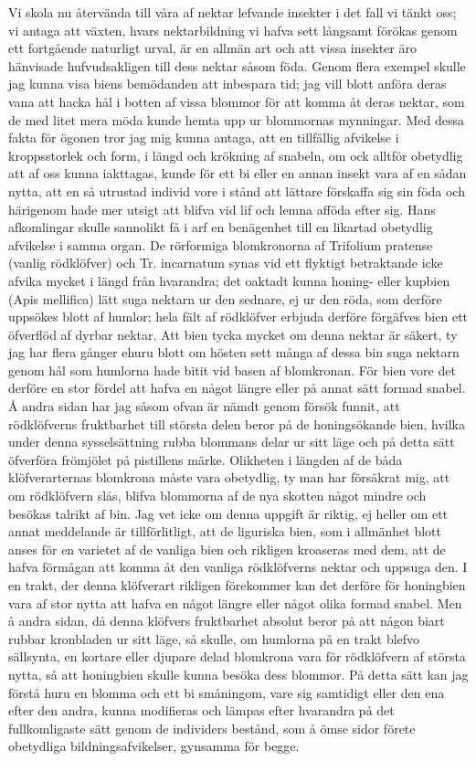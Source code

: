 Vi skola nu återvända till våra af nektar lefvande insekter i det fall vi tänkt oss; vi antaga att växten, hvars nektarbildning vi hafva sett långsamt förökas genom ett fortgående naturligt urval, är en allmän art och att vissa insekter äro hänvisade hufvudsakligen till dess nektar såsom föda. Genom flera exempel skulle jag kunna visa biens bemödanden att inbespara tid; jag vill blott anföra deras vana att hacka hål i botten af vissa blommor för att komma åt deras nektar, som de med litet mera möda kunde hemta upp ur blommornas mynningar. Med dessa fakta för ögonen tror jag mig kunna antaga, att en tillfällig afvikelse i kroppsstorlek och form, i längd och krökning af snabeln, om ock alltför obetydlig att af oss kunna iakttagas, kunde för ett bi eller en annan insekt vara af en sådan nytta, att en så utrustad individ vore i stånd att lättare förskaffa sig sin föda och härigenom hade mer utsigt att blifva vid lif och lemna afföda efter sig. Hans afkomlingar skulle sannolikt få i arf en benägenhet till en likartad obetydlig afvikelse i samma organ. De rörformiga blomkronorna af Trifolium pratense (vanlig rödklöfver) och Tr. incarnatum synas vid ett flyktigt betraktande icke afvika mycket i längd från hvarandra; det oaktadt kunna honing- eller kupbien (Apis mellifica) lätt suga nektarn ur den sednare, ej ur den röda, som derföre uppsökes blott af humlor; hela fält af rödklöfver erbjuda derföre förgäfves bien ett öfverflöd af dyrbar nektar. Att bien tycka mycket om denna nektar är säkert, ty jag har flera gånger ehuru blott om hösten sett många af dessa bin suga nektarn genom hål som humlorna hade bitit vid basen af blomkronan. För bien vore det derföre en stor fördel att hafva en något längre eller på annat sätt formad snabel. Å andra sidan har jag såsom ofvan är nämdt genom försök funnit, att rödklöfverns fruktbarhet till största delen beror på de honingsökande bien, hvilka under denna sysselsättning rubba blommans delar ur sitt läge och på detta sätt öfverföra frömjölet på pistillens märke. Olikheten i längden af de båda klöfverarternas blomkrona måste vara obetydlig, ty man har försäkrat mig, att om rödklöfvern slås, blifva blommorna af de nya skotten något mindre och besökas talrikt af bin. Jag vet icke om denna uppgift är riktig, ej heller om ett annat meddelande är tillförlitligt, att de liguriska bien, som i allmänhet blott anses för en varietet af de vanliga bien och rikligen kroaseras med dem, att de hafva förmågan att komma åt den vanliga rödklöfverns nektar och uppsuga den. I en trakt, der denna klöfverart rikligen förekommer kan det derföre för honingbien vara af stor nytta att hafva en något längre eller något olika formad snabel. Men å andra sidan, då denna klöfvers fruktbarhet absolut beror på att någon biart rubbar kronbladen ur sitt läge, så skulle, om humlorna på en trakt blefvo sällsynta, en kortare eller djupare delad blomkrona vara för rödklöfvern af största nytta, så att honingbien skulle kunna besöka dess blommor. På detta sätt kan jag förstå huru en blomma och ett bi småningom, vare sig samtidigt eller den ena efter den andra, kunna modifieras och lämpas efter hvarandra på det fullkomligaste sätt genom de individers bestånd, som å ömse sidor förete obetydliga bildningsafvikelser, gynsamma för begge.

